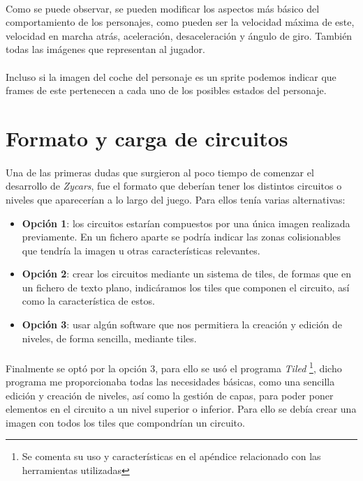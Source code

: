 \paragraph{}
Como se puede observar, se pueden modificar los aspectos más básico del comportamiento de los personajes, como pueden ser la velocidad 
máxima de este, velocidad en marcha atrás, aceleración, desaceleración y ángulo
de giro. También todas las imágenes que representan
al jugador.

\paragraph{}
Incluso si la imagen del coche del personaje es un sprite podemos indicar que
frames de este pertenecen a cada uno de los posibles 
estados del personaje.

\section{Formato y carga de circuitos}

\paragraph{}
Una de las primeras dudas que surgieron al poco tiempo de comenzar el desarrollo de \emph{Zycars}, fue el formato que deberían
tener los distintos circuitos o niveles que aparecerían a lo largo del juego. Para ellos tenía varias alternativas:

\begin{itemize}
    \item \textbf{Opción 1}: los circuitos estarían compuestos por una única imagen realizada previamente. En un fichero aparte se 
    podría indicar las zonas colisionables que tendría la imagen u otras características relevantes.
    
    \item \textbf{Opción 2}: crear los circuitos mediante un sistema de tiles, de formas que en un fichero de texto plano, 
    indicáramos los tiles que componen el circuito, así como la característica de estos.
    
    \item \textbf{Opción 3}: usar algún software que nos permitiera la creación y edición de niveles, de forma sencilla, 
    mediante tiles.
\end{itemize}

\paragraph{}
Finalmente se optó por la opción 3, para ello se usó el programa \emph{Tiled} \footnote{Se comenta su uso y características en el
apéndice relacionado con las herramientas utilizadas}, dicho programa me proporcionaba todas las necesidades básicas, como una 
sencilla edición y creación de niveles, así como la gestión de capas, para poder poner elementos en el circuito a un nivel 
superior o inferior. Para ello se debía crear una imagen con todos los tiles que compondrían un circuito.

